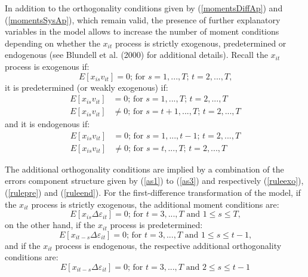 In addition to the orthogonality conditions given by (\ref{momentsDiffAp}) and (\ref{momentsSysAp}), which remain valid, the presence of further explanatory variables in the model allows to increase the number of moment conditions depending on whether the $x_{it}$ process is strictly exogenous, predetermined or endogenous (see Blundell et al. (2000) for additional details). Recall the $x_{it}$ process is exogenous if:
\begin{equation}
\label{ruleexo}
\tag{9'}
E\left[x_{is}v_{it}\right]=0\text{; for $s=1,...,T$; $t=2,...,T$,}
\end{equation}
it is predetermined (or weakly exogenous) if:
\begin{equation}
\label{rulepre}
\tag{10'}
\begin{aligned}
E\left[x_{is}v_{it}\right]&=0\text{; for $s=1,...,T$; $t=2,...,T$}\\
E\left[x_{is}v_{it}\right]&\neq 0\text{; for $s=t+1,...,T$; $t=2,...,T$}
\end{aligned}
\end{equation}
and it is endogenous if:
\begin{equation}
\label{ruleend}
\tag{11'}
\begin{aligned}
E\left[x_{is}v_{it}\right]&=0\text{; for $s=1,...,t-1$; $t=2,...,T$}\\
E\left[x_{is}v_{it}\right]&\neq 0\text{; for $s=t,...,T$; $t=2,...,T$}
\end{aligned}
\end{equation}

The additional orthogonality conditions are implied by a combination of the errors component structure given by (\ref{as1}) to (\ref{as3}) and respectively (\ref{ruleexo}), (\ref{rulepre}) and (\ref{ruleend}). For the first-difference transformation of the model, if the $x_{it}$ process is strictly exogenous, the additional moment conditions are:
\begin{equation}
\label{momentsDiffexo}
\tag{12'}
E\left[x_{is}\Delta \varepsilon_{it}\right]=0 \text{; for $t=3,...,T$ and $1\leq s \leq T$,}
\end{equation}
on the other hand, if the $x_{it}$ process is predetermined:
\begin{equation}
\label{momentsDiffpre}
\tag{13'}
E\left[x_{it-s}\Delta \varepsilon_{it}\right]=0 \text{; for $t=3,...,T$ and $1\leq s\leq t-1$,}
\end{equation}
and if the $x_{it}$ process is endogenous, the respective additional orthogonality conditions are:
\begin{equation}
\label{momentsDiffend}
\tag{14'}
E\left[x_{it-s}\Delta \varepsilon_{it}\right]=0 \text{; for $t=3,...,T$ and $2\leq s \leq t-1$}
\end{equation}

